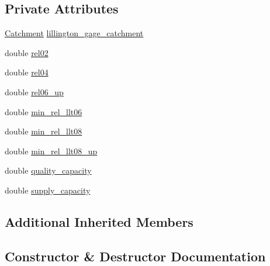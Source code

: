 \subsection*{Private Attributes}
\begin{DoxyCompactItemize}
\item 
\mbox{\hyperlink{classCatchment}{Catchment}} \mbox{\hyperlink{classJordanLakeMinEnvFlowControl_a7f219e0a63dd4171df6ce7954f32904f_a7f219e0a63dd4171df6ce7954f32904f}{lillington\+\_\+gage\+\_\+catchment}}
\item 
double \mbox{\hyperlink{classJordanLakeMinEnvFlowControl_ad093178e42f3ceb287d22a961c47f186_ad093178e42f3ceb287d22a961c47f186}{rel02}}
\item 
double \mbox{\hyperlink{classJordanLakeMinEnvFlowControl_ada2755ec609acff7761acf707daf798c_ada2755ec609acff7761acf707daf798c}{rel04}}
\item 
double \mbox{\hyperlink{classJordanLakeMinEnvFlowControl_ad1dd5a5959f7f43f966a53002dec1f2b_ad1dd5a5959f7f43f966a53002dec1f2b}{rel06\+\_\+up}}
\item 
double \mbox{\hyperlink{classJordanLakeMinEnvFlowControl_a3defdfb0e3c8bb9f222b086cb93b7852_a3defdfb0e3c8bb9f222b086cb93b7852}{min\+\_\+rel\+\_\+llt06}}
\item 
double \mbox{\hyperlink{classJordanLakeMinEnvFlowControl_a3cf68a0987b00668e3b8e582830f05db_a3cf68a0987b00668e3b8e582830f05db}{min\+\_\+rel\+\_\+llt08}}
\item 
double \mbox{\hyperlink{classJordanLakeMinEnvFlowControl_ad6367768fdfff0af0d347ae2ca7e1821_ad6367768fdfff0af0d347ae2ca7e1821}{min\+\_\+rel\+\_\+llt08\+\_\+up}}
\item 
double \mbox{\hyperlink{classJordanLakeMinEnvFlowControl_a671f40efb6f6d3ada453d5d261fc7ebc_a671f40efb6f6d3ada453d5d261fc7ebc}{quality\+\_\+capacity}}
\item 
double \mbox{\hyperlink{classJordanLakeMinEnvFlowControl_a028ed65d1a68c0462334d949ccf19ce2_a028ed65d1a68c0462334d949ccf19ce2}{supply\+\_\+capacity}}
\end{DoxyCompactItemize}
\subsection*{Additional Inherited Members}


\subsection{Constructor \& Destructor Documentation}
\mbox{\label{classJordanLakeMinEnvFlowControl_ac8e2b846b66115c2db3bc4ea3ed44297_ac8e2b846b66115c2db3bc4ea3ed44297}} 
